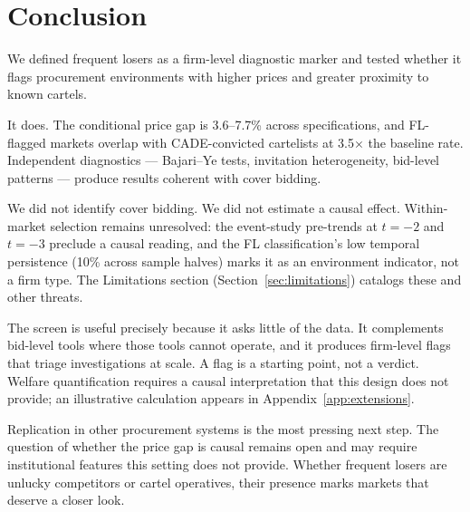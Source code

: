 \section{Conclusion}
\label{sec:conclusion}

We defined frequent losers as a firm-level diagnostic marker and
tested whether it flags procurement environments with higher prices
and greater proximity to known cartels.

It does. The conditional price gap is 3.6--7.7\% across
specifications, and FL-flagged markets overlap with CADE-convicted
cartelists at 3.5$\times$ the baseline rate. Independent diagnostics
--- Bajari--Ye tests, invitation heterogeneity, bid-level
patterns --- produce results coherent with cover bidding.

We did not identify cover bidding. We did not estimate a causal
effect. Within-market selection remains unresolved: the event-study
pre-trends at $t = -2$ and $t = -3$ preclude a causal reading, and
the FL classification's low temporal persistence (10\% across sample
halves) marks it as an environment indicator, not a firm type. The
Limitations section (Section~\ref{sec:limitations}) catalogs these
and other threats.

The screen is useful precisely because it asks little of the data. It
complements bid-level tools where those tools cannot operate, and it
produces firm-level flags that triage investigations at scale. A flag
is a starting point, not a verdict. Welfare quantification requires a
causal interpretation that this design does not provide; an
illustrative calculation appears in
Appendix~\ref{app:extensions}.

Replication in other procurement systems is the most pressing next
step. The question of whether the price gap is causal remains open
and may require institutional features this setting does not provide.
Whether frequent losers are unlucky competitors or cartel operatives,
their presence marks markets that deserve a closer look.
